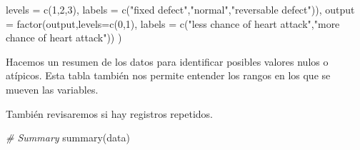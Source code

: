 \documentclass[
]{article}
\newenvironment{Shaded}{\begin{snugshade}}{\end{snugshade}}
\newcommand{\AttributeTok}[1]{\textcolor[rgb]{0.77,0.63,0.00}{#1}}
\newcommand{\CommentTok}[1]{\textcolor[rgb]{0.56,0.35,0.01}{\textit{#1}}}
\newcommand{\DecValTok}[1]{\textcolor[rgb]{0.00,0.00,0.81}{#1}}
\newcommand{\FunctionTok}[1]{\textcolor[rgb]{0.00,0.00,0.00}{#1}}
\newcommand{\NormalTok}[1]{#1}
\newcommand{\StringTok}[1]{\textcolor[rgb]{0.31,0.60,0.02}{#1}}
\begin{document}
\begin{Shaded}
\begin{Highlighting}[]
                   \AttributeTok{levels =} \FunctionTok{c}\NormalTok{(}\DecValTok{1}\NormalTok{,}\DecValTok{2}\NormalTok{,}\DecValTok{3}\NormalTok{),}
                   \AttributeTok{labels =} \FunctionTok{c}\NormalTok{(}\StringTok{"fixed defect"}\NormalTok{,}\StringTok{"normal"}\NormalTok{,}\StringTok{"reversable defect"}\NormalTok{)),}
    \AttributeTok{output =} \FunctionTok{factor}\NormalTok{(output,}\AttributeTok{levels=}\FunctionTok{c}\NormalTok{(}\DecValTok{0}\NormalTok{,}\DecValTok{1}\NormalTok{),}
                    \AttributeTok{labels =} \FunctionTok{c}\NormalTok{(}\StringTok{"less chance of heart attack"}\NormalTok{,}\StringTok{"more chance of heart attack"}\NormalTok{))}
\NormalTok{  )}
\end{Highlighting}
\end{Shaded}

Hacemos un resumen de los datos para identificar posibles valores nulos
o atípicos. Esta tabla también nos permite entender los rangos en los
que se mueven las variables.

También revisaremos si hay registros repetidos.

\begin{Shaded}
\begin{Highlighting}[]
\CommentTok{\# Summary}
\FunctionTok{summary}\NormalTok{(data) }
\end{Highlighting}
\end{Shaded}
\end{document}
